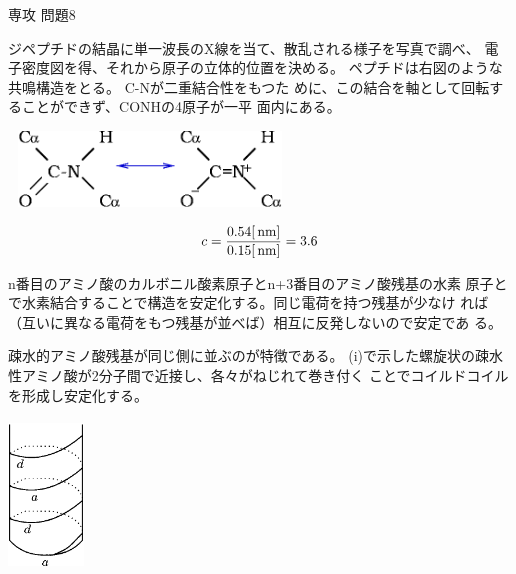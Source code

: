 \documentclass[fleqn]{jbook}
\begin{document}
\begin{answer}{専攻 問題8}{}
\begin{subanswers}
\SubAnswer

 \begin{subsubanswers} 
  \SubSubAnswer
    ジペプチドの結晶に単一波長のX線を当て、散乱される様子を写真で調べ、
   電子密度図を得、それから原子の立体的位置を決める。
%
   \SubSubAnswer   
        ペプチドは右図のような共鳴構造をとる。 C-Nが二重結合性をもつた
       めに、この結合を軸として回転することができず、CONHの4原子が一平
       面内にある。
     \bigskip
   
   \begin{center}
   \includegraphics[clip,height=20mm,width=75mm]{1997phy8-1.eps}
   \end{center}
   \end{subsubanswers}

%
\SubAnswer

  \begin{subsubanswers}
    \SubSubAnswer
\[
c=\frac{0.54[{\,{\rm nm}}]}{0.15[{\,{\rm nm}}]}=3.6
\]

    \SubSubAnswer

     n番目のアミノ酸のカルボニル酸素原子とn+3番目のアミノ酸残基の水素
原子とで水素結合することで構造を安定化する。同じ電荷を持つ残基が少なけ
れば（互いに異なる電荷をもつ残基が並べば）相互に反発しないので安定であ
る。
    \end{subsubanswers}
%
\SubAnswer
\parbox[t]{130mm}{
  \begin{subsubanswers}
    \SubSubAnswer
   疎水的アミノ酸残基が同じ側に並ぶのが特徴である。 
    \SubSubAnswer
(i)で示した螺旋状の疎水性アミノ酸が2分子間で近接し、各々がねじれて巻き付く
ことでコイルドコイルを形成し安定化する。
  \end{subsubanswers}}\parbox[t]{30mm}{
\begin{center}
\includegraphics[clip,height=40mm,width=20mm]{1997phy8-2.eps}
\end{center}
}
%
\end{subanswers}
\end{answer}
\end{document}
